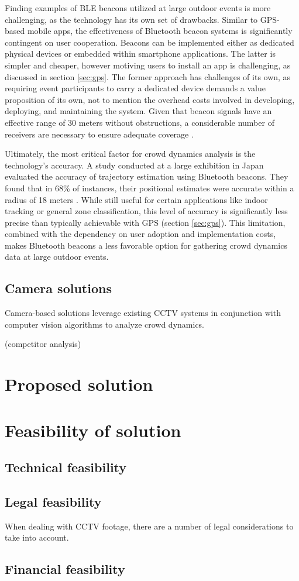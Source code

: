 Finding examples of BLE beacons utilized at large outdoor events is more challenging, as the technology has its own set of drawbacks. Similar to GPS-based mobile apps, the effectiveness of Bluetooth beacon systems is significantly contingent on user cooperation. Beacons can be implemented either as dedicated physical devices or embedded within smartphone applications. The latter is simpler and cheaper, however motiving users to install an app is challenging, as discussed in section \ref{sec:gps}. The former approach has challenges of its own, as requiring event participants to carry a dedicated device demands a value proposition of its own, not to mention the overhead costs involved in developing, deploying, and maintaining the system. Given that beacon signals have an effective range of 30 meters without obstructions, a considerable number of receivers are necessary to ensure adequate coverage \cite{bt_beacon}.

Ultimately, the most critical factor for crowd dynamics analysis is the technology's accuracy. A study conducted at a large exhibition in Japan evaluated the accuracy of trajectory estimation using Bluetooth beacons. They found that  in 68\% of instances, their positional estimates were accurate within a radius of 18 meters \cite{bt_japan}. While still useful for certain applications like indoor tracking or general zone classification, this level of accuracy is significantly less precise than typically achievable with GPS (section \ref{sec:gps}). This limitation, combined with the dependency on user adoption and implementation costs, makes Bluetooth beacons a less favorable option for gathering crowd dynamics data at large outdoor events.

\subsection{Camera solutions}
Camera-based solutions leverage existing CCTV systems in conjunction with computer vision algorithms to analyze crowd dynamics.

(competitor analysis)

\section{Proposed solution}
\label{sec:solution}

\section{Feasibility of solution}
\label{sec:feasibility}
\subsection{Technical feasibility}
\subsection{Legal feasibility}
When dealing with CCTV footage, there are a number of legal considerations to take into account.

\subsection{Financial feasibility}


